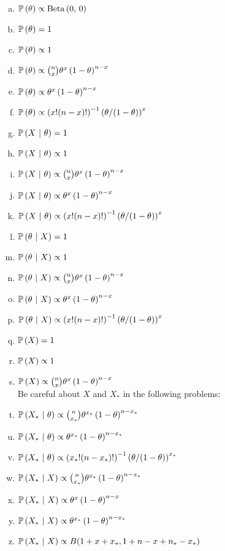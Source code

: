 \documentclass[12pt,landscape]{article}
\begin{document}
\begin{multicols}{2}

\begin{enumerate}[(a)]
\item $\mathbb{P}\left(\theta\right) \propto \mathrm{Beta}\left(0,\,0\right)$
\item $\mathbb{P}\left(\theta\right) = 1$
\item $\mathbb{P}\left(\theta\right) \propto 1$
\item $\mathbb{P}\left(\theta\right) \propto \binom{n}{x}\theta^x \left(1-\theta\right)^{n-x}$
\item $\mathbb{P}\left(\theta\right) \propto \theta^x \left(1-\theta\right)^{n-x}$
\item $\mathbb{P}\left(\theta\right) \propto \left(x! (n-x)!\right)^{-1} \left(\theta / (1-\theta)\right)^{x}$
\item $\mathbb{P}\left(X~|~\theta\right) = 1$
\item $\mathbb{P}\left(X~|~\theta\right) \propto 1$
\item $\mathbb{P}\left(X~|~\theta\right) \propto \binom{n}{x}\theta^x \left(1-\theta\right)^{n-x}$
\item $\mathbb{P}\left(X~|~\theta\right) \propto \theta^x \left(1-\theta\right)^{n-x}$
\item $\mathbb{P}\left(X~|~\theta\right) \propto \left(x! (n-x)!\right)^{-1} \left(\theta / (1-\theta)\right)^{x}$
\item $\mathbb{P}\left(\theta~|~X\right) = 1$
\item $\mathbb{P}\left(\theta~|~X\right) \propto 1$
\item $\mathbb{P}\left(\theta~|~X\right) \propto \binom{n}{x}\theta^x \left(1-\theta\right)^{n-x}$
\item $\mathbb{P}\left(\theta~|~X\right) \propto \theta^x \left(1-\theta\right)^{n-x}$
\item $\mathbb{P}\left(\theta~|~X\right) \propto \left(x! (n-x)!\right)^{-1} \left(\theta / (1-\theta)\right)^{x}$
\item $\mathbb{P}\left(X\right) = 1$
\item $\mathbb{P}\left(X\right) \propto 1$
\item $\mathbb{P}\left(X\right) \propto \binom{n}{x}\theta^x \left(1-\theta\right)^{n-x}$\\

Be careful about $X$ and $X_*$ in the following problems:
\item $\mathbb{P}\left(X_*~|~\theta\right) \propto \binom{n}{x_*}\theta^{x_*} \left(1-\theta\right)^{n-x_*}$
\item $\mathbb{P}\left(X_*~|~\theta\right) \propto \theta^{x_*} \left(1-\theta\right)^{n-x_*}$
\item $\mathbb{P}\left(X_*~|~\theta\right) \propto \left(x_*! (n-x_*)!\right)^{-1} \left(\theta / (1-\theta)\right)^{x_*}$

\item $\mathbb{P}\left(X_*~|~X\right) \propto \binom{n}{x_*}\theta^{x_*} \left(1-\theta\right)^{n-x_*}$
\item $\mathbb{P}\left(X_*~|~X\right) \propto \theta^{x} \left(1-\theta\right)^{n-x}$
\item $\mathbb{P}\left(X_*~|~X\right) \propto \theta^{x_*} \left(1-\theta\right)^{n-x_*}$
\item $\mathbb{P}\left(X_*~|~X\right) \propto B(1 + x + x_*, 1 + n - x + n_* - x_*)$
\end{enumerate}

\end{multicols}
\end{document}
